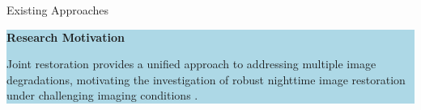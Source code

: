 \documentclass[
    11pt,%
    aspectratio=169,%
]{beamer}
\begin{document}
\begin{frame}{Existing Approaches}

\begin{beamercolorbox}[
    rounded=true,
    sep=0.08cm,
    wd=\textwidth
]{}

\colorbox{LightBlue}{
    \parbox{\dimexpr\textwidth-2\fboxsep\relax}{
        {\color{Navy}\bfseries
        Research Motivation}

        \vspace{0.05cm}

        \fontsize{9}{11}\selectfont

        Joint restoration provides a unified approach to addressing multiple image degradations, motivating the investigation of robust nighttime image restoration under challenging imaging conditions \cite{zhou2022lednet,feijoo2025darkir}.
    }
}

\end{beamercolorbox}
\end{frame}
\end{document}
